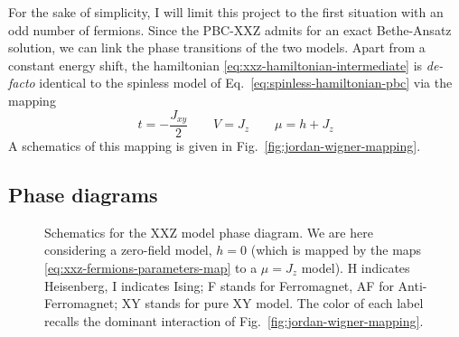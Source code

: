 For the sake of simplicity, I will limit this project to the first situation with an odd number of fermions. Since the PBC-$\mathrm{XXZ}$ admits for an exact Bethe-Ansatz solution, we can link the phase transitions of the two models.
Apart from a constant energy shift, the hamiltonian \eqref{eq:xxz-hamiltonian-intermediate} is \textit{de-facto} identical to the spinless model of Eq.~\eqref{eq:spinless-hamiltonian-pbc} via the mapping
\begin{equation}\label{eq:xxz-fermions-parameters-map}
	t = -\frac{J_{xy}}{2}
	\qquad
	V = J_z
	\qquad
	\mu = h + J_z
\end{equation}
A schematics of this mapping is given in Fig.~\ref{fig:jordan-wigner-mapping}.

\subsection*{Phase diagrams}

\begin{figure}
	\centering
	
	\caption{Schematics for the $\mathrm{XXZ}$ model phase diagram. We are here considering a zero-field model, $h=0$ (which is mapped by the maps \eqref{eq:xxz-fermions-parameters-map} to a $\mu = J_z$ model). H indicates Heisenberg, I indicates Ising; F stands for Ferromagnet, AF for Anti-Ferromagnet; XY stands for pure $\mathrm{XY}$ model. The color of each label recalls the dominant interaction of Fig.~\ref{fig:jordan-wigner-mapping}.}
	\label{fig:xxz-phase-diagram}
\end{figure}

